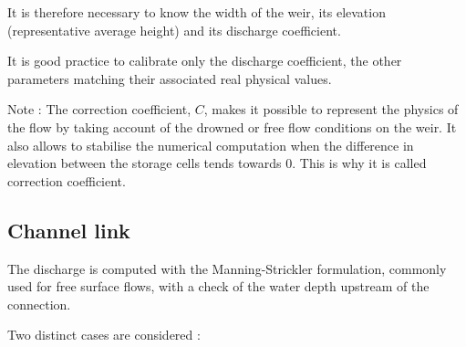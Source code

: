 It is therefore necessary to know the width of the weir, its elevation (representative average height) and its discharge coefficient.

It is good practice to calibrate only the discharge coefficient, the other parameters matching their associated real physical values.

\begin{CommentBlock}{Note :}
The correction coefficient, $C$, makes it possible to represent the physics of the flow by taking account of the drowned or free flow conditions on the weir. It also allows to stabilise the numerical computation when the difference in elevation between the storage cells tends towards $0$. This is why it is called correction coefficient.
\end{CommentBlock}


\subsection{Channel link}

The discharge is computed with the Manning-Strickler formulation, commonly used for free surface flows, with a check of the water depth upstream of the connection.

Two distinct cases are considered :

